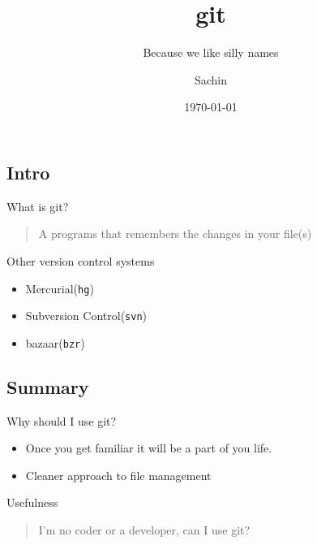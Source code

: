 \documentclass[10pt]{beamer}
\subtitle{Because we like silly names}
\institute{Red Hat}
\author{Sachin}
\date{\today}
\title{git}
\begin{document}
\maketitle


\subsection{Intro}
\label{sec:org9656fa7}
\begin{frame}[label={sec:org3e2e206}]{What is git?}
\begin{quote}
A programs that remembers the changes in your file(s)
\end{quote}
\end{frame}

\begin{frame}[fragile,label={sec:org0797f98}]{Other version control systems}
 \begin{itemize}
\item Mercurial(\texttt{hg})
\item Subversion Control(\texttt{svn})
\item bazaar(\texttt{bzr})
\end{itemize}
\end{frame}

\subsection{Summary}
\label{sec:orgccbdb4f}
\begin{frame}[label={sec:orgf2be779}]{Why should I use git?}
\begin{itemize}
\item Once you get familiar it will be a part of you life.
\item Cleaner approach to file management
\end{itemize}
\end{frame}

\begin{frame}[label={sec:orga540567}]{Usefulness}
\begin{quote}
I'm no coder or a developer, can I use \alert{git}?
\end{quote}
\end{frame}
\end{document}
